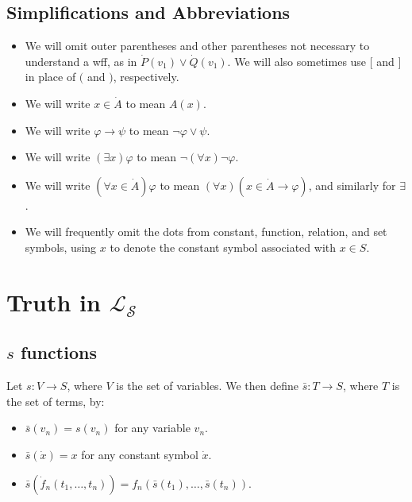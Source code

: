 \documentclass{article}
\begin{document}
\subsection{Simplifications and Abbreviations}
\begin{itemize}
    \item We will omit outer parentheses and other parentheses not necessary to understand a wff, as in $\dot P(v_1) \lor \dot Q(v_1)$. We will also sometimes use $[$ and $]$ in place of $($ and $)$, respectively.
    \item We will write $x \in \dot A$ to mean $A(x)$.
    \item We will write $\varphi \to \psi$ to mean $\neg \varphi \lor \psi$.
    \item We will write $(\exists x) \varphi$ to mean $\neg (\forall x) \neg \varphi$.
    \item We will write $(\forall x \in \dot A)\varphi$ to mean $(\forall x)(x \in \dot A \to \varphi)$, and similarly for $\exists$.
    \item We will frequently omit the dots from constant, function, relation, and set symbols, using $x$ to denote the constant symbol associated with $x \in S$.
\end{itemize}

\section{Truth in $\mathcal{L}_\mathcal{S}$}
\subsection{$s$ functions}
Let $s: V \to S$, where $V$ is the set of variables. We then define $\bar s : T \to S$, where $T$ is the set of terms, by:
\begin{itemize}
    \item $\bar s(v_n) = s(v_n)$ for any variable $v_n$.
    \item $\bar s(\dot x) = x$ for any constant symbol $\dot x$.
    \item $\bar s(\dot f_n(t_1, \ldots, t_n)) = f_n(\bar s(t_1), \ldots, \bar s(t_n))$.
\end{itemize}
\end{document}
